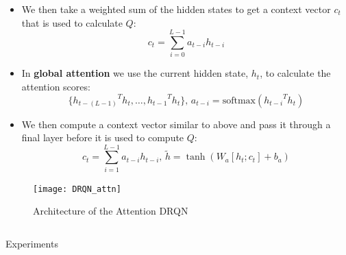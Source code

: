 \documentclass[final]{beamer}
\newlength{\onecolwid}
\newlength{\twocolwid}
\begin{document}
\begin{frame}[t]
\begin{columns}[t]
\begin{column}{\twocolwid}
\begin{columns}[t,totalwidth=\twocolwid]
\begin{column}{\onecolwid}
\begin{itemize}
        \item We then take a weighted sum of the hidden states to get a context
            vector $c_t$ that is used to calculate $Q$:
            $$c_t = \sum_{i=0}^{L-1}a_{t-i}h_{t-i}$$
        \item In \textbf{global attention} we use the current hidden state, $h_t$,
            to calculate the attention scores:
            $$\{{h_{t-(L-1)}}^Th_t, \dots, {h_{t-1}}^Th_t\} \text{, }
              a_{t-i} = \text{softmax}({h_{t-i}}^Th_t)$$
        \item We then compute a context vector similar to above and pass it through
            a final layer before it is used to compute $Q$:
            $$c_t = \sum_{i=1}^{L-1}a_{t-i}h_{t-i} \text{, }
              \tilde{h} = \tanh(W_a[h_t;c_t] + b_a)$$
\end{itemize}

\begin{figure}[h]
    \centering
    \texttt{[image: DRQN\_attn]}
    \caption{Architecture of the Attention DRQN}
\end{figure}


\end{column} %

\end{columns} %


\begin{column}{\twocolwid}

\begin{block}{Experiments}
\end{block}

\end{column}

\begin{columns}[t,totalwidth=\twocolwid] %

\begin{column}{\onecolwid} %


\end{column}
\end{columns}
\end{column}
\end{columns}
\end{frame}
\end{document}
